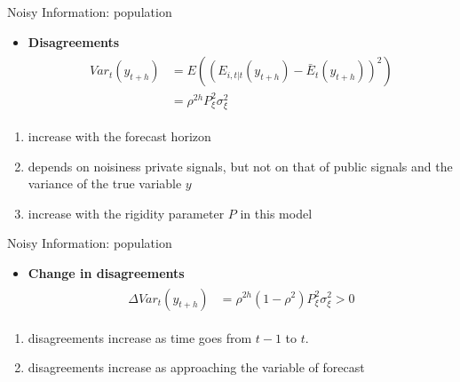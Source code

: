 \documentclass{beamer}
\begin{document}
\begin{frame}{Noisy Information: population}
\begin{itemize}
\item \textbf{Disagreements}
\begin{eqnarray*}
\begin{aligned}
	Var_t(y_{t+h}) & = E((E_{i,t|t}(y_{t+h}) - \bar E_t(y_{t+h}))^2) \\
	& = \rho^{2h} P^2_\xi \sigma^2_\xi  
\end{aligned}
\end{eqnarray*}
\end{itemize}

\begin{enumerate}
	\item increase with the forecast horizon
	\item depends on noisiness private signals, but not on that of public signals and the variance of the true variable $y$ 
	\item increase with the rigidity parameter $P$ in this model
\end{enumerate}

\end{frame}



\begin{frame}{Noisy Information: population}
\begin{itemize}
\item \textbf{Change in disagreements}
\begin{eqnarray*}
\begin{aligned}
\Delta Var_t(y_{t+h}) & = \rho^{2h}(1-\rho^2) P^2_\xi \sigma^2_\xi >0
\end{aligned}
\end{eqnarray*}
\end{itemize}

\begin{enumerate}
	\item disagreements increase as time goes from $t-1$ to $t$. 
	\item disagreements increase as approaching the variable of forecast
\end{enumerate}

\end{frame}
\end{document}
